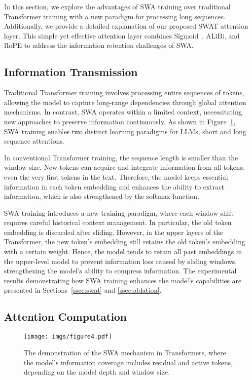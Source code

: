 In this section, we explore the advantages of SWA training over traditional Transformer training with a new paradigm for processing long sequences. Additionally, we provide a detailed explanation of our proposed SWAT attention layer. This simple yet effective attention layer combines Sigmoid~\cite{sigmoid}, ALiBi, and RoPE to address the information retention challenges of SWA.

\subsection{Information Transmission}

Traditional Transformer training involves processing entire sequences of tokens, allowing the model to capture long-range dependencies through global attention mechanisms. In contrast, SWA operates within a limited context, necessitating new approaches to preserve information continuously. As shown in Figure~\ref{fig:att}, SWA training enables two distinct learning paradigms for LLMs, short and long sequence attentions.

In conventional Transformer training, the sequence length is smaller than the window size. New tokens can acquire and integrate information from all tokens, even the very first tokens in the text. Therefore, the model keeps essential information in each token embedding and enhances the ability to extract information, which is also strengthened by the softmax function.

SWA training introduces a new training paradigm, where each window shift requires careful historical context management. In particular, the old token embedding is discarded after sliding. However, in the upper layers of the Transformer, the new token's embedding still retains the old token's embedding with a certain weight. Hence, the model tends to retain all past embeddings in the upper-level model to prevent information loss caused by sliding windows, strengthening the model's ability to compress information. The experimental results demonstrating how SWA training enhances the model's capabilities are presented in Sections~\ref{ssec:swat} and \ref{ssec:ablation}.


\subsection{Attention Computation}
\label{ssec:Attention-Computation}

\begin{figure}[t]
    \centering
    \texttt{[image: imgs/figure4.pdf]}
    \caption{The demonstration of the SWA mechanism in Transformers, where the model's information coverage includes residual and active tokens, depending on the model depth and window size.}
    \label{fig:att}
\end{figure}

